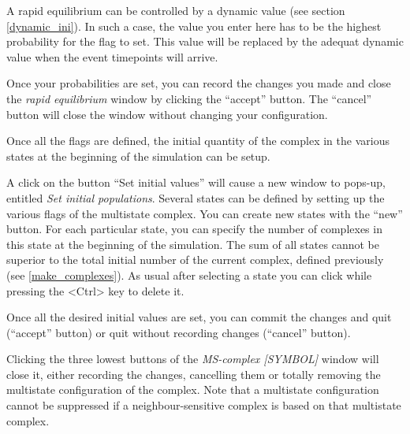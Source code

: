 A rapid equilibrium can be controlled by a dynamic value (see section
\ref{dynamic_ini}). In such a case, the value you enter here has to be the
highest probability for the flag to set. This value will be replaced by the
adequat dynamic value when the event timepoints will arrive.

Once your probabilities are set, you can record the changes you made and close
the \emph{rapid equilibrium} window by clicking the ``accept'' button. The
``cancel'' button will close the window without changing your configuration.

Once all the flags are defined, the initial quantity of the complex in the
various states at the beginning of the simulation can be setup.

 A click on the button
``Set initial values'' will cause a new window to pops-up, entitled \emph{Set
  initial populations}.  Several states can be defined by setting up the various
flags of the multistate complex. You can create new states with the ``new''
button.  For each particular state, you can specify the number of complexes in
this state at the beginning of the simulation. The sum of all states cannot be
superior to the total initial number of the current complex, defined previously
(see \ref{make_complexes}).  As usual after selecting a state you can click
while pressing the <Ctrl> key to delete it.

Once all the desired initial values are set, you can commit the changes and
quit (``accept'' button) or quit without recording changes (``cancel'' button).

Clicking the three lowest buttons of the \emph{MS-complex [SYMBOL]} window will
close it, either recording the changes, cancelling them or totally removing the
multistate configuration of the complex. Note that a multistate configuration
cannot be suppressed if a neighbour-sensitive complex is based on that
multistate complex.

